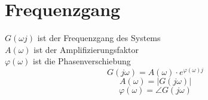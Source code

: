 \section{Frequenzgang}

$G(\omega j)$ ist der Frequenzgang des Systems \\
$A(\omega) $ ist der Amplifizierungsfaktor\\
$\varphi(\omega) $ ist die Phasenverschiebung
\[ \boxed{G(j \omega) = A(\omega) \cdot e^{\varphi(\omega)j}}\]
\[ A(\omega) = |G(j\omega)| \]
\[ \varphi(\omega) = \angle G(j \omega) \]


